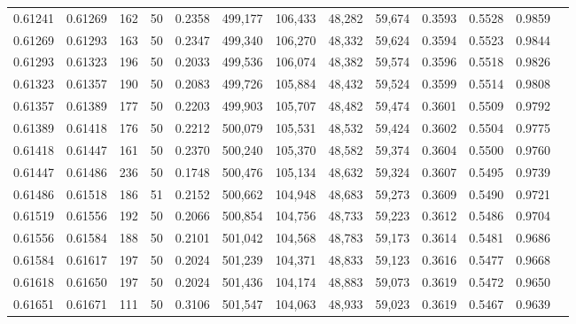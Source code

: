 \begin{tabular}{rrrrrrrrrrrrr}
0.61241 & 0.61269 &   162 &  50 &                                     0.2358 & 499,177 & 106,433 &  48,282 &  59,674 & 0.3593 & 0.5528 & 0.9859 \\
0.61269 & 0.61293 &   163 &  50 &                                     0.2347 & 499,340 & 106,270 &  48,332 &  59,624 & 0.3594 & 0.5523 & 0.9844 \\
0.61293 & 0.61323 &   196 &  50 &                                     0.2033 & 499,536 & 106,074 &  48,382 &  59,574 & 0.3596 & 0.5518 & 0.9826 \\
0.61323 & 0.61357 &   190 &  50 &                                     0.2083 & 499,726 & 105,884 &  48,432 &  59,524 & 0.3599 & 0.5514 & 0.9808 \\
0.61357 & 0.61389 &   177 &  50 &                                     0.2203 & 499,903 & 105,707 &  48,482 &  59,474 & 0.3601 & 0.5509 & 0.9792 \\
0.61389 & 0.61418 &   176 &  50 &                                     0.2212 & 500,079 & 105,531 &  48,532 &  59,424 & 0.3602 & 0.5504 & 0.9775 \\
0.61418 & 0.61447 &   161 &  50 &                                     0.2370 & 500,240 & 105,370 &  48,582 &  59,374 & 0.3604 & 0.5500 & 0.9760 \\
0.61447 & 0.61486 &   236 &  50 &                                     0.1748 & 500,476 & 105,134 &  48,632 &  59,324 & 0.3607 & 0.5495 & 0.9739 \\
0.61486 & 0.61518 &   186 &  51 &                                     0.2152 & 500,662 & 104,948 &  48,683 &  59,273 & 0.3609 & 0.5490 & 0.9721 \\
0.61519 & 0.61556 &   192 &  50 &                                     0.2066 & 500,854 & 104,756 &  48,733 &  59,223 & 0.3612 & 0.5486 & 0.9704 \\
0.61556 & 0.61584 &   188 &  50 &                                     0.2101 & 501,042 & 104,568 &  48,783 &  59,173 & 0.3614 & 0.5481 & 0.9686 \\
0.61584 & 0.61617 &   197 &  50 &                                     0.2024 & 501,239 & 104,371 &  48,833 &  59,123 & 0.3616 & 0.5477 & 0.9668 \\
0.61618 & 0.61650 &   197 &  50 &                                     0.2024 & 501,436 & 104,174 &  48,883 &  59,073 & 0.3619 & 0.5472 & 0.9650 \\
0.61651 & 0.61671 &   111 &  50 &                                     0.3106 & 501,547 & 104,063 &  48,933 &  59,023 & 0.3619 & 0.5467 & 0.9639 \\

\end{tabular}
